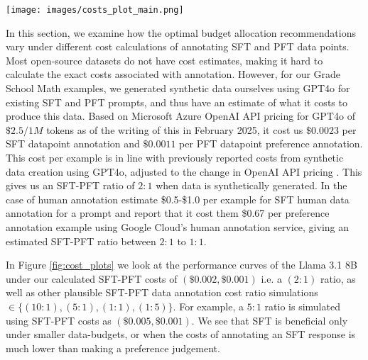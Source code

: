 \begin{figure*}[!ht]
    \centering
    \texttt{[image: images/costs\_plot\_main.png]}
    \caption{Change in performance patterns with varying SFT-PFT data annotation costs for Grade School Math (Top), and Instruction Following (Bottom) on the Llama3.1 8B model. The plot on the left side is with the ground-truth SFT-PFT cost ratio that we incurred from our synthetic SFT and PFT Grade School Math data generated using GPT4o. On the right side, we scale the plot to simulate different SFT-PFT costs.}
    \label{fig:cost_plots}
\end{figure*}

In this section, we examine how the optimal budget allocation recommendations vary under different cost calculations of annotating SFT and PFT data points. Most open-source datasets do not have cost estimates, making it hard to calculate the exact costs associated with annotation. However, for our Grade School Math examples, we generated synthetic data ourselves using GPT4o for existing SFT and PFT prompts, and thus have an estimate of what it costs to produce this data. Based on Microsoft Azure OpenAI API pricing for GPT4o of $\$2.5/1M$ tokens as of the writing of this in February 2025, it cost us $\$0.0023$ per SFT datapoint annotation and $\$0.0011$ per PFT datapoint preference annotation. This cost per example is in line with previously reported costs from synthetic data creation using GPT4o, adjusted to the change in OpenAI API pricing  \cite{wang2023selfinstructaligninglanguagemodels, honovich2022unnatural, pmlr-v235-lee24t}. This gives us an SFT-PFT ratio of $2:1$ when data is synthetically generated. In the case of human annotation \citet{kiela-etal-2021-dynabench} estimate \$0.5-\$1.0 per example for SFT human data annotation for a prompt and \citet{pmlr-v235-lee24t} report that it cost them \$0.67 per preference annotation example using Google Cloud’s human annotation service, giving an estimated SFT-PFT ratio between $2:1$ to $1:1$. 

In Figure \ref{fig:cost_plots}  we look at the performance curves of the Llama 3.1 8B under our calculated SFT-PFT costs of $(\$0.002, \$0.001)$ i.e. a $(2:1)$ ratio, as well as other plausible SFT-PFT data annotation cost ratio simulations $\in\{(10:1), (5:1), (1:1), (1:5)\}$. For example, a $5:1$ ratio is simulated using SFT-PFT costs as $(\$0.005, \$0.001)$. We see that SFT is beneficial only under smaller data-budgets, or when the costs of annotating an SFT response is much lower than making a preference judgement.






 








